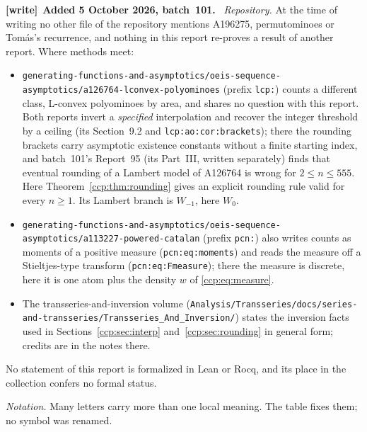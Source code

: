 \documentclass[11pt,letterpaper]{article}
\theoremstyle{remark}\newtheorem{remark}[theorem]{Remark}
\newenvironment{writenote}[1][]{\par\smallskip\begingroup\small
 \noindent\textbf{[write]}\if\relax\detokenize{#1}\relax\else~\textbf{#1.}\fi\ }%
 {\par\endgroup\smallskip}
\begin{document}
\begin{writenote}[Added 5 October 2026, batch~101]
\emph{Repository.} At the time of writing no other file of the repository
mentions A196275, permutominoes or Tom\'as's recurrence, and nothing in this
report re-proves a result of another report. Where methods meet:
\begin{itemize}
\item \nolinkurl{generating-functions-and-asymptotics/oeis-sequence-asymptotics/a126764-lconvex-polyominoes}
 (prefix \nolinkurl{lcp:}) counts a different class, L-convex polyominoes
 by area, and shares no question with this report. Both reports invert a
 \emph{specified} interpolation and recover the integer threshold by a
 ceiling (its Section~9.2 and \nolinkurl{lcp:ao:cor:brackets}); there the
 rounding brackets carry asymptotic existence constants without a finite
 starting index, and batch~101's Report~95 (its Part~III, written
 separately) finds that eventual rounding of a Lambert model of A126764 is
 wrong for $2\le n\le555$. Here Theorem~\ref{ccp:thm:rounding} gives an
 explicit rounding rule valid for every $n\ge1$. Its Lambert branch is
 $W_{-1}$, here $W_0$.
\item \nolinkurl{generating-functions-and-asymptotics/oeis-sequence-asymptotics/a113227-powered-catalan}
 (prefix \nolinkurl{pcn:}) also writes counts as moments of a positive
 measure (\nolinkurl{pcn:eq:moments}) and reads the measure off a
 Stieltjes-type transform (\nolinkurl{pcn:eq:Fmeasure}); there the measure
 is discrete, here it is one atom plus the density $w$ of
 \eqref{ccp:eq:measure}.
\item The transseries-and-inversion volume
 (\nolinkurl{Analysis/Transseries/docs/series-and-transseries/Transseries_And_Inversion/})
 states the inversion facts used in Sections~\ref{ccp:sec:interp}
 and~\ref{ccp:sec:rounding} in general form; credits are in the notes
 there.
\end{itemize}
No statement of this report is formalized in Lean or Rocq, and its place in
the collection confers no formal status.

\emph{Notation.} Many letters carry more than one local meaning. The table
fixes them; no symbol was renamed.


\end{writenote}
\end{document}
